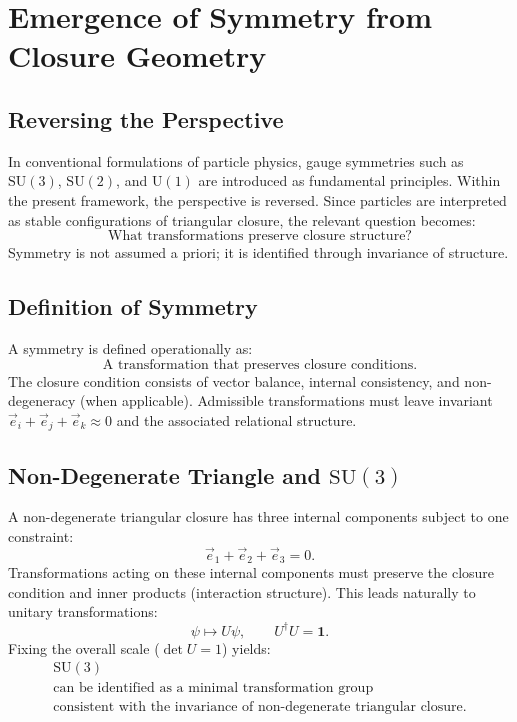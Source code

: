 \section{Emergence of Symmetry from Closure Geometry}
\label{sec:symmetry}

\subsection{Reversing the Perspective}

In conventional formulations of particle physics,
gauge symmetries such as $\mathrm{SU}(3)$, $\mathrm{SU}(2)$, and $\mathrm{U}(1)$
are introduced as fundamental principles.
Within the present framework, the perspective is reversed.
Since particles are interpreted as stable configurations of triangular closure,
the relevant question becomes:
\begin{equation}
  \boxed{\text{What transformations preserve closure structure?}}
\end{equation}
Symmetry is not assumed a priori; it is identified through invariance of structure.

\subsection{Definition of Symmetry}

A symmetry is defined operationally as:
\begin{equation}
  \boxed{\text{A transformation that preserves closure conditions.}}
\end{equation}
The closure condition consists of vector balance, internal consistency,
and non-degeneracy (when applicable).
Admissible transformations must leave invariant
$\vec{e}_i + \vec{e}_j + \vec{e}_k \approx 0$
and the associated relational structure.

\subsection{Non-Degenerate Triangle and \texorpdfstring{$\mathrm{SU}(3)$}{SU(3)}}

A non-degenerate triangular closure has three internal components
subject to one constraint:
\begin{equation}
  \vec{e}_1 + \vec{e}_2 + \vec{e}_3 = 0.
\end{equation}
Transformations acting on these internal components must preserve
the closure condition and inner products (interaction structure).
This leads naturally to unitary transformations:
\begin{equation}
  \psi \mapsto U\psi, \qquad U^\dagger U = \mathbf{1}.
\end{equation}
Fixing the overall scale ($\det U = 1$) yields:
\begin{equation}
  \boxed{\begin{gathered}
    \mathrm{SU}(3) \\
    \text{can be identified as a minimal transformation group} \\
    \text{consistent with the invariance of non-degenerate triangular closure.}
  \end{gathered}}
\end{equation}

